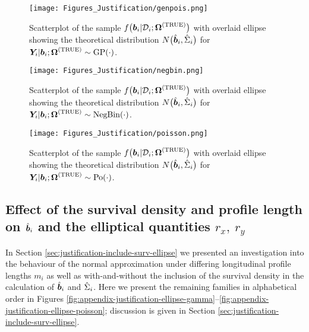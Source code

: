 \clearpage
\thispagestyle{empty}
\begin{landscape}
\begin{figure}
    \centering
    \texttt{[image: Figures\_Justification/genpois.png]}
    \caption{Scatterplot of the sample $f\big(\bm{b}_i|\mathcal{D}_i;\bm{\mathrm{\Omega}}^{(\mathrm{TRUE})}\big)$ with overlaid ellipse showing the theoretical distribution $N\big(\hat{\bm{b}}_i,\hat{\Sigma}_i\big)$ for $\bm{Y}_i|\bm{b}_i;\bm{\mathrm{\Omega}}^{(\mathrm{TRUE})}\sim\mathrm{GP}\!\left(\cdot\right)$.}
    \label{fig:appendix-justification-genpois}
\end{figure}
\vfill
\lscapepageno
\end{landscape}
\clearpage
\thispagestyle{empty}
\begin{landscape}
\begin{figure}
    \centering
    \texttt{[image: Figures\_Justification/negbin.png]}
    \caption{Scatterplot of the sample $f\big(\bm{b}_i|\mathcal{D}_i;\bm{\mathrm{\Omega}}^{(\mathrm{TRUE})}\big)$ with overlaid ellipse showing the theoretical distribution $N\big(\hat{\bm{b}}_i,\hat{\Sigma}_i\big)$ for $\bm{Y}_i|\bm{b}_i;\bm{\mathrm{\Omega}}^{(\mathrm{TRUE})}\sim\mathrm{NegBin}\!\left(\cdot\right)$.}
    \label{fig:appendix-justification-negbin}
\end{figure}
\vfill
\lscapepageno
\end{landscape}
\clearpage
\thispagestyle{empty}
\begin{landscape}
\begin{figure}
    \centering
    \texttt{[image: Figures\_Justification/poisson.png]}
    \caption{Scatterplot of the sample $f\big(\bm{b}_i|\mathcal{D}_i;\bm{\mathrm{\Omega}}^{(\mathrm{TRUE})}\big)$ with overlaid ellipse showing the theoretical distribution $N\big(\hat{\bm{b}}_i,\hat{\Sigma}_i\big)$ for $\bm{Y}_i|\bm{b}_i;\bm{\mathrm{\Omega}}^{(\mathrm{TRUE})}\sim\mathrm{Po}\!\left(\cdot\right)$.}
    \label{fig:appendix-justification-poisson}
\end{figure}
\vfill
\lscapepageno
\end{landscape}
\clearpage
\restoregeometry

\subsection{Effect of the survival density and profile length on \texorpdfstring{$\hat{\bm{b}}_i$}{hb} and the elliptical quantities \texorpdfstring{$r_x,\ r_y$}{rxry}}\label{sec:appendix-suppfigs-justification-ellipses}
In Section \ref{sec:justification-include-surv-ellipse} we presented an investigation into the behaviour of the normal approximation under differing longitudinal profile lengths $m_i$ as well as with-and-without the inclusion of the survival density in the calculation of $\hat{\bm{b}}_i$ and $\hat{\Sigma}_i$. Here we present the remaining families in alphabetical order in Figures \ref{fig:appendix-justification-ellipse-gamma}--\ref{fig:appendix-justification-ellipse-poisson}; discussion is given in Section \ref{sec:justification-include-surv-ellipse}.

